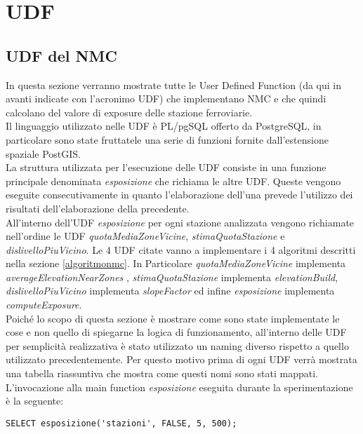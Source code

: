 \justify
\chapter{UDF}
\label{udf}
\section{UDF del NMC}
\label{udfnmc}
In questa sezione verranno mostrate tutte le User Defined Function (da qui in avanti indicate con l'acronimo UDF) che implementano NMC e che quindi calcolano del valore di exposure delle stazione ferroviarie.\\ Il linguaggio utilizzato nelle UDF è PL/pgSQL offerto da PostgreSQL, in particolare sono state fruttatele una serie di funzioni fornite dall’estensione spaziale PostGIS.\\
La struttura utilizzata per l'esecuzione delle UDF consiste in una funzione principale denominata \textit{esposizione} che richiama le altre UDF. Queste vengono eseguite consecutivamente in quanto l'elaborazione dell'una prevede l'utilizzo dei risultati dell'elaborazione della precedente. \\
All'interno dell'UDF \textit{esposizione} per ogni stazione analizzata vengono richiamate nell'ordine le UDF \textit{quotaMediaZoneVicine}, \textit{stimaQuotaStazione} e \textit{dislivelloPiuVicino}. Le 4 UDF citate vanno a implementare i 4 algoritmi descritti nella sezione \ref{algoritmonmc}. In Particolare \textit{quotaMediaZoneVicine} implementa \textit{averageElevationNearZones} , \textit{stimaQuotaStazione} implementa \textit{elevationBuild}, \textit{dislivelloPiuVicino} implementa \textit{slopeFactor} ed infine \textit{esposizione} implementa \textit{computeExposure}.\\
Poiché lo scopo di questa sezione è mostrare come sono state implementate le cose e non quello di spiegarne la logica di funzionamento, all'interno delle UDF per semplicità realizzativa è stato utilizzato un naming diverso rispetto a quello utilizzato precedentemente. Per questo motivo prima di ogni UDF verrà mostrata una tabella riassuntiva che mostra come questi nomi sono stati mappati.\\
L'invocazione alla main function \textit{esposizione} eseguita durante la sperimentazione è la seguente:

\begin{lstlisting}[style=mySQL]
SELECT esposizione('stazioni', FALSE, 5, 500);
\end{lstlisting}   

